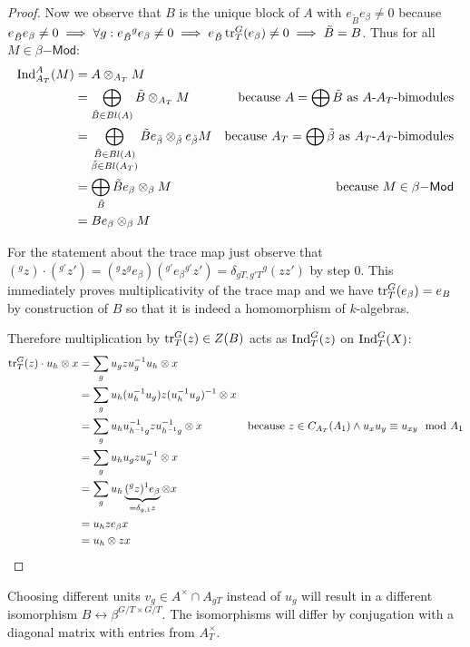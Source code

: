 \begin{proof}
Now we observe that $B$ is the unique block of $A$ with $e_{\tilde{B}} e_\beta \neq 0$ because $e_{\tilde{B}} e_\beta \neq 0 \implies \forall  g: e_{\tilde{B}} {^g e_\beta} \neq 0 \implies e_{\tilde{B}} \operatorname{tr}_T^ G(e_\beta) \neq 0 \implies \tilde{B}=B$. Thus for all $M\in \beta\mathsf{-Mod}$:
\begin{align*}
\operatorname{Ind}_{A_T}^A(M) &= A \otimes_{A_T} M \\
&= \bigoplus_{\tilde{B}\in Bl(A)} \tilde{B}\otimes_{A_T} M &\text{because $A=\bigoplus \tilde{B}$ as $A$-$A_T$-bimodules}\\
&= \bigoplus_{\substack{\tilde{B}\in Bl(A) \\ \tilde{\beta}\in Bl(A_T)}} \tilde{B}e_{\tilde{\beta}}\otimes_{\tilde{\beta}} e_{\tilde{\beta}} M &\text{because $A_T=\bigoplus \tilde{\beta}$ as $A_T$-$A_T$-bimodules}\\
&= \bigoplus_{\tilde{B}} \tilde{B}e_\beta \otimes_\beta M &\text{because }M\in\beta\mathsf{-Mod} \\
&= Be_\beta \otimes_\beta M
\end{align*}

For the statement about the trace map just observe that $(^g z)\cdot (^{g'} z') = ({^g z}{^g e_\beta})({^{g'}e_\beta}{^{g'} z'}) = \delta_{gT,g'T} {^g(zz')}$ by step 0. This immediately proves multiplicativity of the trace map and we have $\operatorname{tr}_T^G(e_\beta)=e_B$ by construction of $B$ so that it is indeed a homomorphism of $k$-algebras.

Therefore multiplication by $\operatorname{tr}_T^G(z) \in Z(B)$ acts as $\operatorname{Ind}_T^G(z)$ on $\operatorname{Ind}_T^G(X)$:
\begin{align*}
\operatorname{tr}_T^G(z) \cdot u_h\otimes x &= \sum_g u_g z u_g^{-1} u_h \otimes x \\
&= \sum_g u_h (u_h^{-1} u_g)z(u_h^{-1} u_g)^{-1}  \otimes x\\
&= \sum_g u_h u_{h^{-1}g}^{-1} z u_{h^{-1} g}^{-1} \otimes x &\text{because }z\in C_{A_T}(A_1) \wedge u_x u_y \equiv u_{xy} \mod A_1 \\
&= \sum_g u_h u_g z u_g^{-1} \otimes x \\
&= \sum_g u_h \underbrace{(^g z){^1 e_\beta}}_{=\delta_{g,1} z} \otimes x \\
&= u_h z e_\beta x \\
&= u_h \otimes zx \qedhere
\end{align*}
\end{proof}

\begin{remark}
Choosing different units $v_g\in A^\times\cap A_{gT}$ instead of $u_g$ will result in a different isomorphism $B \leftrightarrow \beta^{G/T \times G/T}$. The isomorphisms will differ by conjugation with a diagonal matrix with entries from $A_T^\times$.
\end{remark}

